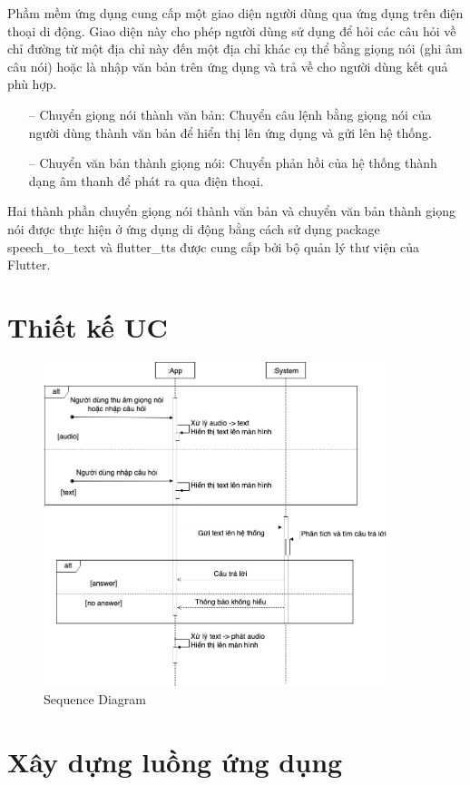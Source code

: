 Phầm mềm ứng dụng cung cấp một giao diện người dùng qua ứng dụng trên điện thoại di động. Giao diện này cho phép người dùng sử dụng để hỏi các câu hỏi về chỉ đường từ một địa chỉ này đến một địa chỉ khác cụ thể bằng giọng nói (ghi âm câu nói) hoặc là nhập văn bản trên ứng dụng và trả về cho người dùng kết quả phù hợp.
\begin{itemize}
    \item[--] Chuyển giọng nói thành văn bản: Chuyển câu lệnh bằng giọng nói của người dùng thành văn bản để hiển thị lên ứng dụng và gửi lên hệ thống.
    \item[--] Chuyển văn bản thành giọng nói: Chuyển phản hồi của hệ thống thành dạng âm thanh để phát ra qua điện thoại.
\end{itemize}

Hai thành phần chuyển giọng nói thành văn bản và chuyển văn bản thành giọng nói được thực hiện ở ứng dụng di động bằng cách sử dụng package speech\_to\_text\cite{stt} và flutter\_tts\cite{tts} được cung cấp bởi bộ quản lý thư viện của Flutter.

\section{Thiết kế UC}

\begin{figure}[H]
    \centering
    \includegraphics[width=10cm]{images/Sequence-Diagram.png}
    \caption{Sequence Diagram}
    \label{fig:UC}
\end{figure}

\section{Xây dựng luồng ứng dụng}

